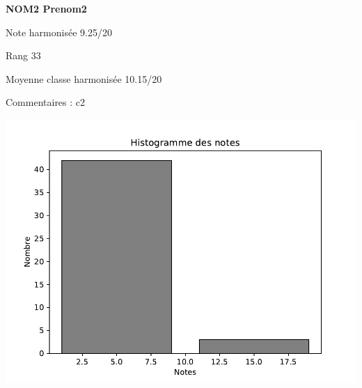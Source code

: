 \begin{minipage}[c]{.45\linewidth} 
\Large \textbf{\textsf{NOM2 Prenom2}} 
 
 \normalsize Note harmonisée 9.25/20 
 
Rang 33
 
Moyenne classe harmonisée 10.15/20 
 
Commentaires : 
c2 
\end{minipage}\hfill 
\begin{minipage}[c]{.45\linewidth}  
\begin{center}
\includegraphics[width=.8\linewidth]{../histo.pdf} 
\end{center}
\end{minipage}
\footnotesize 
